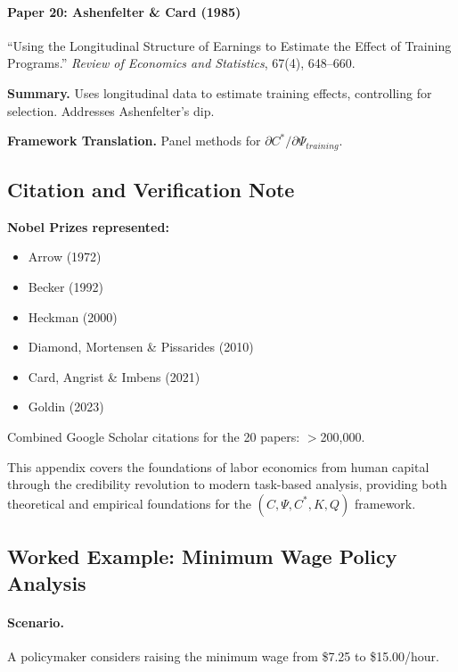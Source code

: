 \paragraph{Paper 20: Ashenfelter \& Card (1985)}

``Using the Longitudinal Structure of Earnings to Estimate the Effect of 
Training Programs.''
\textit{Review of Economics and Statistics}, 67(4), 648--660.

\textbf{Summary.}
Uses longitudinal data to estimate training effects, controlling for 
selection. Addresses Ashenfelter's dip.

\textbf{Framework Translation.}
Panel methods for $\partial C^*/\partial \Psi_{training}$.

\subsection{Citation and Verification Note}

\textbf{Nobel Prizes represented:}
\begin{itemize}
    \item Arrow (1972)
    \item Becker (1992)
    \item Heckman (2000)
    \item Diamond, Mortensen \& Pissarides (2010)
    \item Card, Angrist \& Imbens (2021)
    \item Goldin (2023)
\end{itemize}

Combined Google Scholar citations for the 20 papers: $>$200,000.

This appendix covers the foundations of labor economics from human capital
through the credibility revolution to modern task-based analysis, providing
both theoretical and empirical foundations for the $(C, \Psi, C^*, K, Q)$ framework.

\subsection{Worked Example: Minimum Wage Policy Analysis}
\label{sec:aa-worked-example}

\paragraph{Scenario.}
A policymaker considers raising the minimum wage from \$7.25 to \$15.00/hour.

